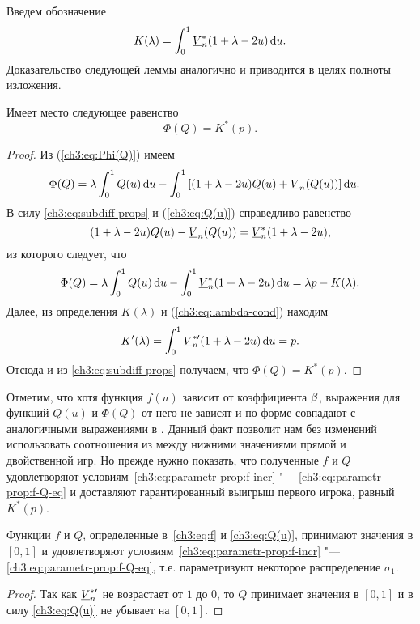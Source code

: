 {Введем обозначение
\begin{equation*}
  K(\lambda) = \int_0^1 \LV[*]{n}(1+\lambda-2u) \di u.
\end{equation*}
Доказательство следующей леммы аналогично \cite{demeyer02} и приводится в целях полноты изложения.
\begin{lemma}
  Имеет место следующее равенство
  \begin{equation}\label{ch3:eq:phi=k*}
    \Phi(Q) = K^*(p).
  \end{equation}
\end{lemma}
\begin{proof}
  Из (\ref{ch3:eq:Phi(Q)}) имеем
  \begin{align*}
    \Phi(Q)
    &= \lambda \int_0^1 Q(u) \di u
    - \int_0^1 \left[ (1+\lambda-2u) Q(u) + \LV{n}(Q(u)) \right] \di u.
  \end{align*}
  В силу \eqref{ch3:eq:subdiff-props} и (\ref{ch3:eq:Q(u)}) справедливо равенство
  \begin{equation*}
    (1+\lambda-2u) Q(u) - \LV{n}(Q(u)) = \LV[*]{n}(1+\lambda-2u),
  \end{equation*}
  из которого следует, что
  \begin{align*}
    \Phi(Q)
    = \lambda \int_0^1 Q(u) \di u - \int_0^1 \LV[*]{n}(1+\lambda-2u) \di u = \lambda p - K(\lambda).
  \end{align*}
  Далее, из определения $K(\lambda)$ и (\ref{ch3:eq:lambda-cond}) находим
  \[
    K'(\lambda) = \int_0^1 \LV[*\prime]{n}(1+\lambda-2u) \di u = p.
  \]
  Отсюда и из \eqref{ch3:eq:subdiff-props} получаем, что $\Phi(Q) = K^*(p)$.
\end{proof}

Отметим, что хотя функция $f(u)$ зависит от коэффициента $\beta$, выражения для функций $Q(u)$ и $\Phi(Q)$ от него не зависят и по форме совпадают с аналогичными выражениями в \cite{demeyer02}.
Данный факт позволит нам без изменений использовать соотношения из \cite{demeyer02} между нижними значениями прямой и двойственной игр.
Но прежде нужно показать, что полученные $f$ и $Q$ удовлетворяют условиям~\eqref{ch3:eq:parametr-prop:f-incr} "--- \eqref{ch3:eq:parametr-prop:f-Q-eq} и доставляют гарантированный выигрыш первого игрока, равный $K^*(p)$.

\begin{lemma}
  \label{ch3:lem:f-Q-is-strategy}
  Функции $f$ и $Q$\textnormal{,} определенные в~\eqref{ch3:eq:f} и \eqref{ch3:eq:Q(u)}\textnormal{,} принимают значения в $[0, 1]$ и удовлетворяют условиям~\eqref{ch3:eq:parametr-prop:f-incr} "--- \eqref{ch3:eq:parametr-prop:f-Q-eq}\textnormal{,} т.е. параметризуют некоторое распределение $\sigma_1$.
\end{lemma}
\begin{proof}
  Так как $\LV[ *\prime ]{n}$ не возрастает от $1$ до $0$, то $Q$ принимает значения в $[0, 1]$ и в силу \eqref{ch3:eq:Q(u)} не убывает на $[0, 1]$.


\end{proof}}
